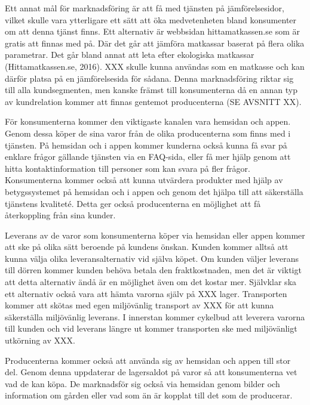 \documentclass[10pt,a4paper,oneside]{article}
\begin{document}
Ett annat mål för marknadsföring är att få med tjänsten på jämförelsesidor, vilket skulle vara ytterligare ett sätt att öka medvetenheten bland konsumenter om att denna tjänst finns. Ett alternativ är webbsidan hittamatkassen.se som är gratis att finnas med på. Där det går att jämföra matkassar baserat på flera olika parametrar. Det går bland annat att leta efter ekologiska matkassar (Hittamatkassen.se, 2016). XXX skulle kunna användas som en matkasse och kan därför platsa på en jämförelsesida för sådana. Denna marknadsföring riktar sig till alla kundsegmenten, men kanske främst till konsumenterna då en annan typ av kundrelation kommer att finnas gentemot producenterna (SE AVSNITT XX). 

För konsumenterna kommer den viktigaste kanalen vara hemsidan och appen. Genom dessa köper de sina varor från de olika producenterna som finns med i tjänsten. På hemsidan och i appen kommer kunderna också kunna få svar på enklare frågor gällande tjänsten via en FAQ-sida, eller få mer hjälp genom att hitta kontaktinformation till personer som kan svara på fler frågor. Konsumenterna kommer också att kunna utvärdera produkter med hjälp av betygssystemet på hemsidan och i appen och genom det hjälpa till att säkerställa tjänstens kvaliteté. Detta ger också producenterna en möjlighet att få återkoppling från sina kunder. 

Leverans av de varor som konsumenterna köper via  hemsidan eller appen kommer att ske på olika sätt beroende på kundens önskan. Kunden kommer alltså att kunna välja olika leveransalternativ vid själva köpet. Om kunden väljer leverans till dörren kommer kunden behöva betala den fraktkostnaden, men det är viktigt att detta alternativ ändå är en möjlighet även om det kostar mer. Självklar ska ett alternativ också vara att hämta varorna själv på XXX lager. Transporten kommer att skötas med egen miljövänlig transport av XXX för att kunna säkerställa miljövänlig leverans. I innerstan kommer cykelbud att leverera varorna till kunden och vid leverans längre ut kommer transporten ske med miljövänligt utkörning av XXX.

Producenterna kommer också att använda sig av hemsidan och appen till stor del. Genom denna uppdaterar de lagersaldot på varor så att konsumenterna vet vad de kan köpa. De marknadsför sig också via hemsidan genom bilder och information om gården eller vad som än är kopplat till det som de producerar. 
\end{document}
